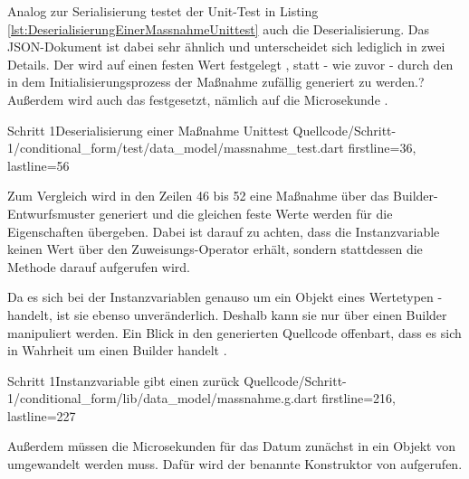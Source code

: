 Analog zur Serialisierung testet der Unit-Test in Listing \ref{lst:DeserialisierungEinerMassnahmeUnittest} auch die Deserialisierung.
Das JSON-Dokument ist dabei sehr ähnlich und unterscheidet sich lediglich in zwei Details.
Der  wird auf einen festen Wert festgelegt , statt - wie zuvor - durch den in dem Initialisierungsprozess der Maßnahme zufällig generiert zu werden.?
Außerdem wird auch das  festgesetzt, nämlich auf die Microsekunde  .

\begin{alexlisting}{Schritt 1}{Deserialisierung einer Maßnahme Unittest}
  {Quellcode/Schritt-1/conditional_form/test/data_model/massnahme_test.dart}
  {firstline=36, lastline=56}
  \label{lst:DeserialisierungEinerMassnahmeUnittest}
\end{alexlisting}


Zum Vergleich wird in den Zeilen 46 bis 52 eine Maßnahme über das Builder-Entwurfsmuster generiert und die gleichen feste Werte werden für die Eigenschaften übergeben.
Dabei ist darauf zu achten, dass die Instanzvariable  keinen Wert über den Zuweisungs-Operator \IC{=} erhält, sondern stattdessen die Methode  darauf aufgerufen wird.

Da es sich bei der Instanzvariablen  genauso um ein Objekt eines Wertetypen - handelt, ist sie ebenso unveränderlich.
Deshalb kann sie nur über einen Builder manipuliert werden.
Ein Blick in den generierten Quellcode offenbart, dass es sich in Wahrheit um einen Builder handelt .

\begin{alexlisting}{Schritt 1}{Instanzvariable  gibt einen  zurück}
  {Quellcode/Schritt-1/conditional_form/lib/data_model/massnahme.g.dart}
  {firstline=216, lastline=227}
  \label{lst:Schritt1InstanzvariableLetzteBearbeitungGibtEinenLetzteBearbeitungBuilderZurueck}
\end{alexlisting}

Außerdem müssen die Microsekunden für das Datum zunächst in ein Objekt von  umgewandelt werden muss.
Dafür wird der benannte Konstruktor  von   aufgerufen.

